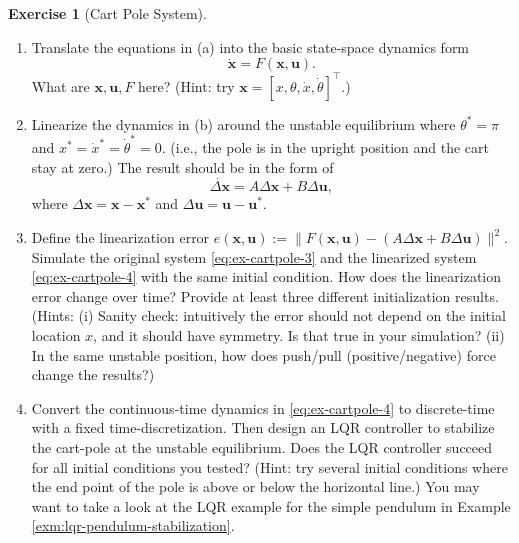 \documentclass[
]{book}
\theoremstyle{definition}
\theoremstyle{definition}
\theoremstyle{definition}
\newtheorem{exercise}{Exercise}[chapter]
\theoremstyle{definition}
\theoremstyle{remark}
\begin{document}
\begin{exercise}[Cart Pole System]
\begin{enumerate}
\def\labelenumi{\alph{enumi}.}
\setcounter{enumi}{1}
\item
  Translate the equations in (a) into the basic state-space dynamics form
  \begin{equation}
  \dot{\mathbf{x}}=F(\mathbf{x}, \mathbf{u}).
  \label{eq:ex-cartpole-3}
  \end{equation}
  What are \(\mathbf{x},\mathbf{u},F\) here?
  (Hint: try \(\mathbf{x}=[x,\theta,\dot{x},\dot{\theta}]^\top\).)
\item
  Linearize the dynamics in (b) around the unstable equilibrium where \(\theta^*=\pi\) and \(x^*=\dot{x}^*=\dot{\theta}^*=0.\) (i.e., the pole is in the upright position and the cart stay at zero.) The result should be in the form of
  \begin{equation}
  \dot{\Delta\mathbf{x}}=A\Delta\mathbf{x}+B\Delta\mathbf{u},
  \label{eq:ex-cartpole-4}
  \end{equation}
  where \(\Delta\mathbf{x} = \mathbf{x}-\mathbf{x}^*\) and \(\Delta\mathbf{u}=\mathbf{u}-\mathbf{u}^*\).
\item
  Define the linearization error \(e(\mathbf{x}, \mathbf{u}):=\|F(\mathbf{x}, \mathbf{u}) - (A\Delta\mathbf{x}+B\Delta\mathbf{u})\|^2\). Simulate the original system \eqref{eq:ex-cartpole-3} and the linearized system \eqref{eq:ex-cartpole-4} with the same initial condition. How does the linearization error change over time? Provide at least three different initialization results.
  (Hints: (i) Sanity check: intuitively the error should not depend on the initial location \(x\), and it should have symmetry. Is that true in your simulation? (ii) In the same unstable position, how does push/pull (positive/negative) force change the results?)
\item
  Convert the continuous-time dynamics in \eqref{eq:ex-cartpole-4} to discrete-time with a fixed time-discretization. Then design an LQR controller to stabilize the cart-pole at the unstable equilibrium. Does the LQR controller succeed for all initial conditions you tested? (Hint: try several initial conditions where the end point of the pole is above or below the horizontal line.) You may want to take a look at the LQR example for the simple pendulum in Example \ref{exm:lqr-pendulum-stabilization}.
\end{enumerate}

\end{exercise}

~
\end{document}
